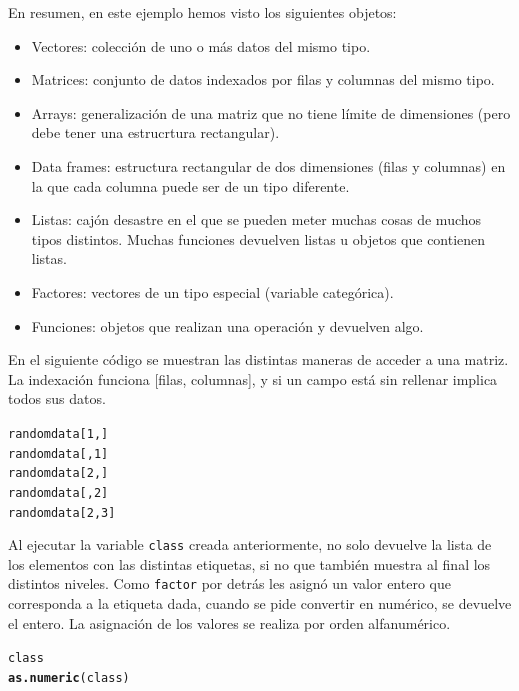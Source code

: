 \documentclass{config/apuntes}\usepackage[]{graphicx}\usepackage[]{xcolor}
\makeatletter
\newcommand{\hlnum}[1]{\textcolor[rgb]{0.686,0.059,0.569}{#1}}%
\newcommand{\hldef}[1]{\textcolor[rgb]{0.345,0.345,0.345}{#1}}%
\newcommand{\hlkwd}[1]{\textcolor[rgb]{0.737,0.353,0.396}{\textbf{#1}}}%
\newenvironment{kframe}{%
 \def\at@end@of@kframe{}%
 \ifinner\ifhmode%
  \def\at@end@of@kframe{\end{minipage}}%
  \begin{minipage}{\columnwidth}%
 \fi\fi%
 \def\FrameCommand##1{\hskip\@totalleftmargin \hskip-\fboxsep
 \colorbox{shadecolor}{##1}\hskip-\fboxsep
     \hskip-\linewidth \hskip-\@totalleftmargin \hskip\columnwidth}%
 \MakeFramed {\advance\hsize-\width
   \@totalleftmargin\z@ \linewidth\hsize
   \@setminipage}}%
 {\par\unskip\endMakeFramed%
 \at@end@of@kframe}
\newenvironment{knitrout}{}{} %
\newcommand{\code}[1]{\texttt{#1}}
\makeatother
\begin{document}
En resumen, en este ejemplo hemos visto los siguientes objetos:
\begin{itemize}
\item Vectores: colección de uno o más datos del mismo tipo.
\item Matrices: conjunto de datos indexados por filas y columnas del mismo tipo. 
\item Arrays: generalización de una matriz que no tiene límite de dimensiones (pero debe tener una estrucrtura rectangular). 
\item Data frames: estructura rectangular de dos dimensiones (filas y columnas) en la que cada columna puede ser de un tipo diferente. 
\item Listas: cajón desastre en el que se pueden meter muchas cosas de muchos tipos distintos. Muchas funciones devuelven listas u objetos que contienen listas.
\item Factores: vectores de un tipo especial (variable categórica).
\item Funciones: objetos que realizan una operación y devuelven algo. 
\end{itemize}

En el siguiente código se muestran las distintas maneras de acceder a una matriz. La indexación funciona [filas, columnas], y si un campo está sin rellenar implica todos sus datos.

\begin{knitrout}
\color{fgcolor}\begin{kframe}
\begin{alltt}
\hldef{randomdata[}\hlnum{1}\hldef{, ]}
\hldef{randomdata[,} \hlnum{1}\hldef{]}
\hldef{randomdata[}\hlnum{2}\hldef{, ]}
\hldef{randomdata[,} \hlnum{2}\hldef{]}
\hldef{randomdata[}\hlnum{2}\hldef{,} \hlnum{3}\hldef{]}
\end{alltt}
\end{kframe}
\end{knitrout}

Al ejecutar la variable \code{class} creada anteriormente, no solo devuelve la lista de los elementos con las distintas etiquetas, si no que también muestra al final los distintos niveles. Como \code{factor} por detrás les asignó un valor entero que corresponda a la etiqueta dada, cuando se pide convertir en numérico, se devuelve el entero. La asignación de los valores se realiza por orden alfanumérico.

\begin{knitrout}
\color{fgcolor}\begin{kframe}
\begin{alltt}
\hldef{class}
\hlkwd{as.numeric}\hldef{(class)}
\end{alltt}
\end{kframe}
\end{knitrout}
\end{document}
